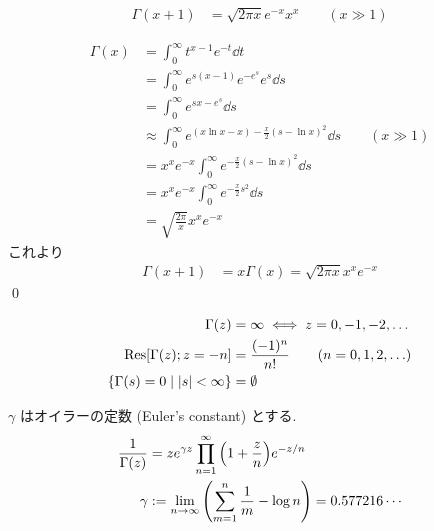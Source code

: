 \documentclass[uplatex,dvipdfmx,a4paper,11pt]{jlreq}
\makeatletter
\theoremstyle{definition}
\renewenvironment{proof}[1][\proofname]{\par
  \normalfont
  \topsep6\p@\@plus6\p@ \trivlist
  \item[\hskip\labelsep{\bfseries #1}\@addpunct{\bfseries}]\ignorespaces\quad\par
}{%
  \qed\endtrivlist\@endpefalse
}
\renewcommand\proofname{証明}
\makeatother
\begin{document}
\begin{proposition}
  \begin{align}
    \Gamma(x + 1) & = \sqrt{2\pi x}e^{-x}x^x \qquad (x \gg 1)
  \end{align}
\end{proposition}
\begin{proof}
  \begin{align}
    \Gamma(x) & = \int_0^\infty t^{x - 1}e^{-t}\dd{t}                                                    \\
              & = \int_0^\infty e^{s(x - 1)}e^{-e^s}e^s\dd{s}                                            \\
              & = \int_0^\infty e^{sx - e^s}\dd{s}                                                       \\
              & \approx \int_0^\infty e^{(x\ln x - x) - \frac{x}{2}(s - \ln x)^2}\dd{s} \qquad (x \gg 1) \\
              & = x^xe^{-x}\int_0^\infty e^{-\frac{x}{2}(s - \ln x)^2}\dd{s}                             \\
              & = x^xe^{-x}\int_0^\infty e^{-\frac{x}{2}s^2}\dd{s}                                       \\
              & = \sqrt{\frac{2\pi}{x}}x^xe^{-x}
  \end{align}
  これより
  \begin{align}
    \Gamma(x + 1) & = x\Gamma(x) = \sqrt{2\pi x}x^xe^{-x}
  \end{align}
\end{proof}

\begin{proposition}[ガンマ関数の極と零点]
  \begin{align}
    \Gamma(z)                                    & = \infty \iff z = 0, -1, -2, \ldots           \\
    \Res[\Gamma(z); z = -n]                      & = \frac{(-1)^n}{n!} \qquad (n = 0,1,2,\ldots) \\
    \lbrace\Gamma(s) = 0\mid |s| < \infty\rbrace & = \emptyset
  \end{align}
\end{proposition}

\begin{proposition}
  $\gamma$ はオイラーの定数 (Euler's constant) とする.
  \begin{align}
    \frac{1}{\Gamma(z)} & = ze^{\gamma z}\prod_{n=1}^{\infty}\qty(1 + \frac{z}{n})e^{-z/n}              \\
    \gamma              & := \lim_{n\to\infty}\qty(\sum_{m=1}^{n}\frac{1}{m} - \log n) = 0.577216\cdots
  \end{align}
\end{proposition}
\end{document}
